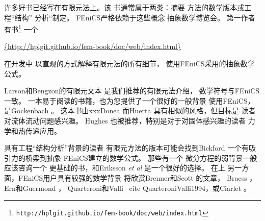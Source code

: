 许多好书已经写在有限元法上。该
书通常属于两类：摘要
方法的数学版本或工程“结构”
分析“制定。 FEniCS严格依赖于这些概念
抽象数学博览会。 第一作者有书\footnote{\texttt{http://hplgit.github.io/fem-book/doc/web/index.html}}\cite{Langtangen_Mardal_FEM_2016}
一个
\begin{center}
  \url{{http://hplgit.github.io/fem-book/doc/web/index.html}}
\end{center}
在开发中
以直观的方式解释有限元法的所有细节，
使用FEniCS采用的抽象数学公式。

Larson和Bengzon的有限元文本 \cite{Larson_2013}
是我们推荐的有限元法介绍，
数学符号与FEniCS一致。
一本易于阅读的书籍，也为您提供了一个很好的一般背景
使用FEniCS，是Gockenbach \cite{Gockenbach2006}。 这本书由xxxDonea
而Huerta \cite{DoneaHuerta2003}具有相似的风格，但目标是
读者对流体流动问题感兴趣。 Hughes \cite{Hughes1987}
也被推荐，特别是对于对固体感兴趣的读者
力学和热传递应用。

具有工程“结构分析”背景的读者
有限元方法的版本可能会找到Bickford
\cite{Bickford1994}一个有吸引力的桥梁到抽象
FEniCS建立的数学公式。 那些有一个
微分方程的弱背景一般应该咨询一个
更基础的书，和Eriksson \emph{et al}
\cite{ErikssonEstepHansboEtAl1996}是一个很好的选择。 在上
另一方面，FEniCS用户具有较强的数学背景
将欣赏Brenner和Scott \cite{BrennerScott2008}的文章，
Braess \cite{Braess2007}，Ern和Guermond \cite{ErnGuermond2004}，
Quarteroni和Valli \ cite {QuarteroniValli1994}，或Ciarlet
\cite{Ciarlet2002}。
